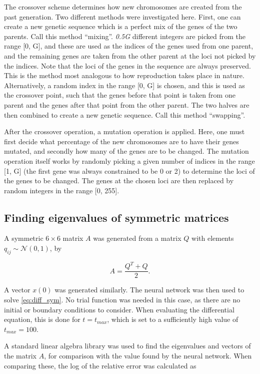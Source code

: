 \documentclass[multicolumn, 9pt]{extarticle}
\begin{document}
The crossover scheme determines how new chromosomes are created from the past generation. Two different methods were investigated here. First, one can create a new genetic sequence which is a perfect mix of the genes of the two parents. Call this method ``mixing''. \textit{0.5G} different integers are picked from the range [0, G], and these are used as the indices of the genes used from one parent, and the remaining genes are taken from the other parent at the loci not picked by the indices. Note that the loci of the genes in the sequence are always preserved. This is the method most analogous to how reproduction takes place in nature. Alternatively, a random index in the range [0, G] is chosen, and this is used as the crossover point, such that the genes before that point is taken from one parent and the genes after that point from the other parent. The two halves are then combined to create a new genetic sequence. Call this method ``swapping''.

After the crossover operation, a mutation operation is applied. Here, one must first decide what percentage of the new chromosomes are to have their genes mutated, and secondly how many of the genes are to be changed. The mutation operation itself works by randomly picking a given number of indices in the range [1, G] (the first gene was always constrained to be 0 or 2) to determine the loci of the genes to be changed. The genes at the chosen loci are then replaced by random integers in the range [0, 255].

\subsection{Finding eigenvalues of symmetric matrices}
A symmetric $6\times6$ matrix $A$ was generated from a matrix $Q$ with elements $q_{ij} \sim \mathcal{N}(0,1)$, by

\begin{equation}\label{eq:symmat}
	A=\frac{Q^T+Q}{2}.
\end{equation}

A vector $x(0)$ was generated similarly. The neural network was then used to solve \eqref{eq:diff_sym}. No trial function was needed in this case, as there are no initial or boundary conditions to consider. When evaluating the differential equation, this is done for $t=t_{max}$, which is set to a sufficiently high value of $t_{max}=100$.

A standard linear algebra library was used to find the eigenvalues and vectors of the matrix $A$, for comparison with the value found by the neural network. When comparing these, the log of the relative error was calculated as
\end{document}
